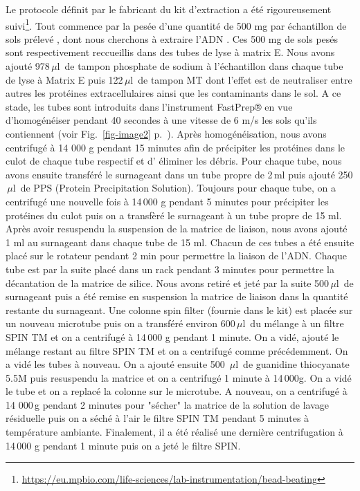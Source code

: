 \documentclass[a4paper,11pt]{article}
\begin{document}
Le protocole définit par le fabricant du kit d'extraction a été
rigoureusement
suivi\footnote{\url{https://eu.mpbio.com/life-sciences/lab-instrumentation/bead-beating}}.
Tout commence par la pesée d'une quantité de 500 mg par échantillon de sols prélevé , dont nous cherchons à extraire l'ADN . Ces
500 mg de sols pesés sont respectivement reccueillis dans des tubes de
lyse à matrix E. Nous avons ajouté 978\,$\mu$l\, de tampon phosphate
de sodium à l'échantillon dans chaque tube de lyse à Matrix E puis
122\,$\mu$l\, de tampon MT dont l'effet est de neutraliser entre
autres les protéines extracellulaires ainsi que les contaminants dans
le sol.  A ce stade, les tubes sont introduits dans l'instrument
FastPrep® en vue d'homogénéiser pendant 40 secondes à une vitesse de 6
m/s les sols qu'ils contiennent (voir Fig.~\ref{fig-image2}
p.~\pageref{fig-image2}).  Après homogénéisation, nous avons
centrifugé à 14 000 g pendant 15 minutes afin de précipiter les
protéines dans le culot de chaque tube respectif et d' éliminer les
débris.  Pour chaque tube, nous avons ensuite transféré le surnageant
dans un tube propre de 2\,ml puis ajouté 250 \,$\mu$l\, de PPS
(Protein Precipitation Solution). Toujours pour chaque tube, on a
centrifugé une nouvelle fois à 14\,000 g pendant 5 minutes pour
précipiter les protéines du culot puis on a transfèré le surnageant à
un tube propre de 15 ml.  Après avoir resuspendu la suspension de la
matrice de liaison, nous avons ajouté 1 ml au surnageant dans chaque
tube de 15 ml. Chacun de ces tubes a été ensuite placé sur le rotateur
pendant 2 min pour permettre la liaison de l'ADN. Chaque tube est par
la suite placé dans un rack pendant 3 minutes pour permettre la
décantation de la matrice de silice.  Nous avons retiré et jeté par la
suite 500\,$\mu$l\, de surnageant puis a été remise en suspension la
matrice de liaison dans la quantité restante du surnageant. Une
colonne spin filter (fournie dans le kit) est placée sur un nouveau
microtube puis on a transféré environ 600\,$\mu$l\, du mélange à un
filtre SPIN TM et on a centrifugé à 14\,000 g pendant 1 minute. On a
vidé, ajouté le mélange restant au filtre SPIN TM et on a centrifugé
comme précédemment. On a vidé les tubes à nouveau.  On a ajouté
ensuite 500 \,$\mu$l\, de guanidine thiocyanate 5.5M puis resuspendu
la matrice et on a centrifugé 1 minute à 14\,000g. On a vidé le tube
et on a replacé la colonne sur le microtube.  A nouveau, on a
centrifugé à 14 000\,g pendant 2 minutes pour "sécher" la matrice de
la solution de lavage résiduelle puis on a séché à l'air le filtre
SPIN TM pendant 5 minutes à température ambiante. Finalement, il a été
réalisé une dernière centrifugation à 14\,000 g pendant 1 minute puis
on a jeté le filtre SPIN.
\end{document}
